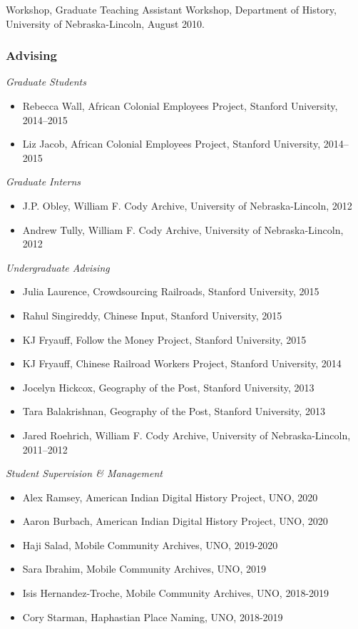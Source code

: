 Workshop, Graduate Teaching Assistant Workshop, Department of History,
University of Nebraska-Lincoln, August 2010.

\subsubsection{Advising}\label{advising}

\emph{Graduate Students}

\begin{itemize}
\tightlist
\item
  Rebecca Wall, African Colonial Employees Project, Stanford University,
  2014--2015
\item
  Liz Jacob, African Colonial Employees Project, Stanford University,
  2014--2015
\end{itemize}

\emph{Graduate Interns}

\begin{itemize}
\tightlist
\item
  J.P. Obley, William F. Cody Archive, University of Nebraska-Lincoln,
  2012
\item
  Andrew Tully, William F. Cody Archive, University of Nebraska-Lincoln,
  2012
\end{itemize}

\emph{Undergraduate Advising}

\begin{itemize}
\tightlist
\item
  Julia Laurence, Crowdsourcing Railroads, Stanford University, 2015
\item
  Rahul Singireddy, Chinese Input, Stanford University, 2015
\item
  KJ Fryauff, Follow the Money Project, Stanford University, 2015
\item
  KJ Fryauff, Chinese Railroad Workers Project, Stanford University,
  2014
\item
  Jocelyn Hickcox, Geography of the Post, Stanford University, 2013
\item
  Tara Balakrishnan, Geography of the Post, Stanford University, 2013
\item
  Jared Roehrich, William F. Cody Archive, University of
  Nebraska-Lincoln, 2011--2012
\end{itemize}

\emph{Student Supervision \& Management}

\begin{itemize}
\tightlist
\item
  Alex Ramsey, American Indian Digital History Project, UNO, 2020
\item
  Aaron Burbach, American Indian Digital History Project, UNO, 2020
\item
  Haji Salad, Mobile Community Archives, UNO, 2019-2020
\item
  Sara Ibrahim, Mobile Community Archives, UNO, 2019
\item
  Isis Hernandez-Troche, Mobile Community Archives, UNO, 2018-2019
\item
  Cory Starman, Haphastian Place Naming, UNO, 2018-2019
\end{itemize}

